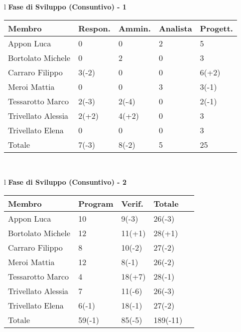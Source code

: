 \begin{table}[hbtp]
\large{
\begin{tabular}{l}
\Large{\textbf{\textsf{Fase di Sviluppo (Consuntivo) - 1}}} \\
\begin{tabular}{||p{3.5cm}||p{2cm}||p{2cm}||p{2cm}||p{2cm}||}
\hline
\textbf{Membro} & \textbf{Respon.} & \textbf{Ammin.} & \textbf{Analista} & \textbf{Progett.}\\ \hline
{Appon Luca}&0&0&2&5 \\ \hline 
{Bortolato Michele} &0&2&0&3\\ \hline
{Carraro Filippo}&3\footnotesize{(-2)}&0&0&6\footnotesize{(+2)} \\ \hline
{Meroi Mattia}&0&0&3&3\footnotesize{(-1)}\\ \hline
{Tessarotto Marco} &2\footnotesize{(-3)}&2\footnotesize{(-4)}&0&2\footnotesize{(-1)}\\ \hline
{Trivellato Alessia} &2\footnotesize{(+2)}&4\footnotesize{(+2)}&0&3 \\ \hline
{Trivellato Elena} &0&0&0&3 \\ \hline
{Totale}& 7\footnotesize{(-3)}&8\footnotesize{(-2)}&5&25 \\ \hline
\end{tabular} \\
\end{tabular}
}
\end{table}
\begin{table}[hbtp]
\large{
\begin{tabular}{l}
\Large{\textbf{\textsf{Fase di Sviluppo (Consuntivo) - 2}}} \\
\begin{tabular}{||p{3.5cm}||p{2cm}||p{2cm}||p{2cm}||p{2cm}||}
\hline
\textbf{Membro} & \textbf{Program} & \textbf{Verif.} & \textbf{Totale}\\ \hline
{Appon Luca}&10&9\footnotesize{(-3)}&26\footnotesize{(-3)} \\ \hline 
{Bortolato Michele} &12&11\footnotesize{(+1)}&28\footnotesize{(+1)}\\ \hline
{Carraro Filippo}&8&10\footnotesize{(-2)}&27\footnotesize{(-2)} \\ \hline
{Meroi Mattia}&12&8\footnotesize{(-1)}&26\footnotesize{(-2)}\\ \hline
{Tessarotto Marco} &4&18\footnotesize{(+7)}&28\footnotesize{(-1)}\\ \hline
{Trivellato Alessia} &7&11\footnotesize{(-6)}&26\footnotesize{(-3)} \\ \hline
{Trivellato Elena} &6\footnotesize{(-1)}&18\footnotesize{(-1)}&27\footnotesize{(-2)} \\ \hline
{Totale}& 59\footnotesize{(-1)}&85\footnotesize{(-5)}&189\footnotesize{(-11)} \\ \hline
\end{tabular} \\
\end{tabular}
}
\end{table}


